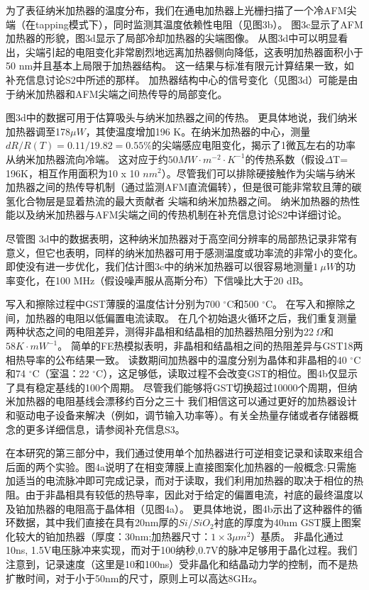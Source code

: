 为了表征纳米加热器的温度分布，我们在通电加热器上光栅扫描了一个冷AFM尖端（在tapping模式下），同时监测其温度依赖性电阻（见图3b）。 图3c显示了AFM加热器的形貌，图3d显示了局部冷却加热器的尖端图像。 从图3d中可以明显看出，尖端引起的电阻变化非常剧烈地远离加热器侧向降低，这表明加热器面积小于50 nm并且基本上局限于加热器结构。 这一结果与标准有限元计算结果一致，如补充信息讨论S2中所述的那样。 加热器结构中心的信号变化（见图3d）可能是由于纳米加热器和AFM尖端之间热传导的局部变化。

图3d中的数据可用于估算吸头与纳米加热器之间的传热。 更具体地说，我们纳米加热器调至178$\mu W$，其使温度增加196 K。在纳米加热器的中心，测量$dR/R\left ( T \right ) = 0.11 / 19.82 = 0.55 \%$的尖端感应电阻变化，揭示了1微瓦左右的功率从纳米加热器流向冷端。 这对应于约$50MW \cdot m^{-2} \cdot{} K^{-1}$的传热系数（假设$\Delta$T= 196K，相互作用面积为10 x 10 $nm^{2}$）。尽管我们可以排除硬接触作为尖端与纳米加热器之间的热传导机制（通过监测AFM直流偏转），但是很可能非常软且薄的碳氢化合物层是显着热流的最大贡献者 尖端和纳米加热器之间。 纳米加热器的热性能以及纳米加热器与AFM尖端之间的传热机制在补充信息讨论S2中详细讨论。

尽管图 3d中的数据表明，这种纳米加热器对于高空间分辨率的局部热记录非常有意义，但它也表明，同样的纳米加热器可用于感测温度或功率流的非常小的变化。 即使没有进一步优化，我们估计图3c中的纳米加热器可以很容易地测量$1\ \mu W$的功率变化，在100 MHz（假设噪声服从高斯分布）下信噪比大于20 dB。

写入和擦除过程中GST薄膜的温度估计分别为700 $^{\circ}$C和500 $^{\circ}$C。 在写入和擦除之间，加热器的电阻以低偏置电流读取。 在几个初始退火循环之后，我们重复测量两种状态之间的电阻差异，测得非晶相和结晶相的加热器热阻分别为22$\ \Omega$和$58K \cdot{} mW^{-1}$。 简单的FE热模拟表明，非晶相和结晶相之间的热阻差异与GST18两相热导率的公布结果一致。 读数期间加热器中的温度分别为晶体和非晶相的40 $^{\circ} $C和74 $^{\circ}$C（室温：22 $^{\circ}$C），这足够低，读取过程不会改变GST的相位。图4b仅显示了具有稳定基线的100个周期。 尽管我们能够将GST切换超过10000个周期，但纳米加热器的电阻基线会漂移约百分之三十 我们相信这可以通过更好的加热器设计和驱动电子设备来解决（例如，调节输入功率等）。有关全热量存储或者存储器概念的更多详细信息，请参阅补充信息S3。

在本研究的第三部分中，我们通过使用单个加热器进行可逆相变记录和读取来组合后面的两个实验。图4a说明了在相变薄膜上直接图案化加热器的一般概念:只需施加适当的电流脉冲即可完成记录，而对于读取，我们利用加热器的取决于相位的热阻。由于非晶相具有较低的热导率，因此对于给定的偏置电流，衬底的最终温度以及铂加热器的电阻高于晶体相（见图4a）。 更具体地说，图4b示出了这种器件的循环数据，其中我们直接在具有20nm厚的$Si/SiO_{2}$衬底的厚度为40nm GST膜上图案化较大的铂加热器（厚度：30nm;加热器尺寸：$1 \times 3\mu m^{2}$）基质。 非晶化通过10ns, 1.5V电压脉冲来实现，而对于100纳秒,0.7V的脉冲足够用于晶化过程。我们注意到，记录速度（这里是10和100ns）受非晶化和结晶动力学的控制，而不是热扩散时间，对于小于50nm的尺寸，原则上可以高达8GHz。


